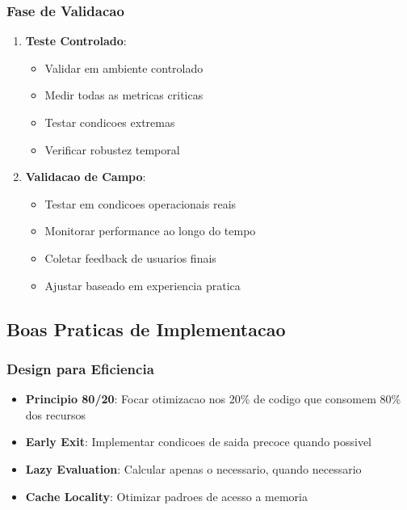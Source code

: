 \subsubsection{Fase de Validacao}
\begin{enumerate}
    \item \textbf{Teste Controlado}:
    \begin{itemize}
        \item Validar em ambiente controlado
        \item Medir todas as metricas criticas
        \item Testar condicoes extremas
        \item Verificar robustez temporal
    \end{itemize}
    
    \item \textbf{Validacao de Campo}:
    \begin{itemize}
        \item Testar em condicoes operacionais reais
        \item Monitorar performance ao longo do tempo
        \item Coletar feedback de usuarios finais
        \item Ajustar baseado em experiencia pratica
    \end{itemize}
\end{enumerate}

\subsection{Boas Praticas de Implementacao}

\subsubsection{Design para Eficiencia}
\begin{itemize}
    \item \textbf{Principio 80/20}: Focar otimizacao nos 20\% de codigo que consomem 80\% dos recursos
    \item \textbf{Early Exit}: Implementar condicoes de saida precoce quando possivel
    \item \textbf{Lazy Evaluation}: Calcular apenas o necessario, quando necessario
    \item \textbf{Cache Locality}: Otimizar padroes de acesso a memoria
\end{itemize}

